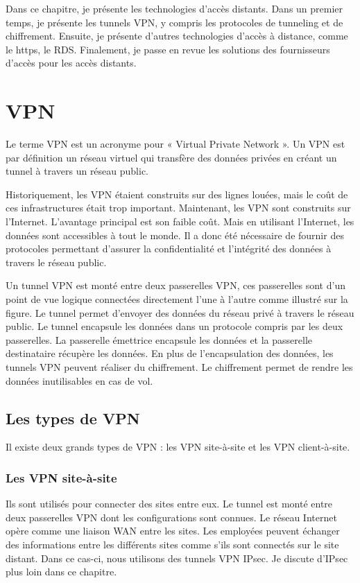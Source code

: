 Dans ce chapitre, je présente les technologies d'accès distants.
Dans un premier temps, je présente les tunnels VPN, y compris les protocoles de tunneling et de chiffrement.
Ensuite, je présente d'autres technologies d'accès à distance, comme le https, le RDS.
Finalement, je passe en revue les solutions des fournisseurs d'accès pour les accès distants.
\section{VPN}
Le terme VPN est un acronyme pour « Virtual Private Network ».
Un VPN est par définition un réseau virtuel qui transfère des données privées en créant un tunnel à travers un réseau public.

Historiquement, les VPN étaient construits sur des lignes louées, mais le coût de ces infrastructures était trop important.
Maintenant, les VPN sont construits sur l'Internet.
L'avantage principal est son faible coût.
Mais en utilisant l'Internet, les données sont accessibles à tout le monde. 
Il a donc été nécessaire de fournir des protocoles permettant d'assurer la confidentialité et l'intégrité des données à travers le réseau public. 

Un tunnel VPN est monté entre deux passerelles VPN, ces passerelles sont d'un point de vue logique connectées directement l'une à l'autre comme illustré sur la figure. 
Le tunnel permet d'envoyer des données du réseau privé à travers le réseau public.
Le tunnel encapsule les données dans un protocole compris par les deux passerelles. 
La passerelle émettrice encapsule les données et la passerelle destinataire récupère les données. 
En plus de l'encapsulation des données, les tunnels VPN peuvent réaliser du chiffrement. 
Le chiffrement permet de rendre les données  inutilisables en cas de vol. 

\subsection{Les types de VPN}
Il existe deux grands types de VPN : les VPN site-à-site et les VPN client-à-site.  

\subsubsection{Les VPN site-à-site} 
Ils sont utilisés pour connecter des sites entre eux. 
Le tunnel est monté entre deux passerelles VPN dont les configurations sont connues. 
Le réseau Internet opère comme une liaison WAN entre les sites. 
Les employées peuvent échanger des informations entre les différents sites comme s'ils sont connectés sur le site distant. 
Dans ce cas-ci, nous utilisons des tunnels VPN IPsec. 
Je discute d'IPsec plus loin dans ce chapitre. 

